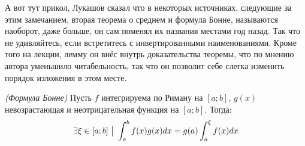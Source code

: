 \begin{anote}
	А вот тут прикол, Лукашов сказал что в некоторых источниках, следующие за этим замечанием, вторая теорема о среднем и формула Бонне, называются наоборот, даже больше, он сам поменял их названия местами год назад. Так что не удивляйтесь, если встретитесь с инвертированными наименованиями. Кроме того на лекции, лемму он внёс внутрь доказательства теоремы, что по мнению автора уменьшило читабельность, так что он позволит себе слегка изменить порядок изложения в этом месте.
\end{anote}

\begin{lemma} \textit{(Формула Бонне)}
	Пусть $f$ интегрируема по Риману на $[a;b]$, $g(x)$ невозрастающая и неотрицательная функция на $[a;b]$. Тогда:
	\[
		\exists \xi \in [a;b] \ \big|\  \int_a^bf(x)g(x)dx = g(a)\int_a^\xi f(x)dx
	\]
\end{lemma}


